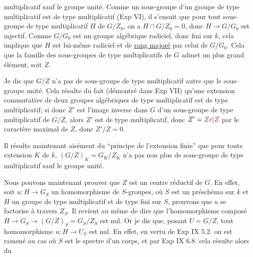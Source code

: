 multiplicatif  sauf le groupe unité. Comme un sous-groupe d'un groupe de type multiplicatif est de type multiplicatif (Exp VI\quad), il s'ensuit que  pour tout sous-groupe de type multiplicatif $H$ de $G/Z_0$, on a $H\cap G/Z_0=0$, donc $H\longrightarrow G/G_0$ est injectif. Comme $G/G_0$ est un groupe algébrique radiciel, donc fini sur $k$, cela implique que $H$ est lui-même radiciel et de \uline{rang majoré} par celui de $G/G_0$. Cela  que la famille des sous-groupes de type multiplicatifs de $G$ admet un plus grand élément, soit $Z$.

Je dis que $G/Z$ n'a pas de sous-groupe de type multiplicatif autre que le sous-groupe unité. Cela résulte du fait (démontré dans Exp VII\quad) qu'une extension commutative de deux groupes algébriques de type multiplicatif est de type multiplicatif;  si donc $Z'$ est l'image inverse dans $G$ d'un sous-groupe de type multiplicatif de $G/Z$, alors $Z'$ est de type multiplicatif, donc $Z'=\unsure{Zc|Z}$ par le caractère maximal de $Z$, donc $Z'/Z=0$.

Il résulte maintenant aisément du ``principe de l'extension finie'' que pour toute extension $K$ de $k$, $(G/Z)_K=G_K/Z_K$ n'a pas non plus de sous-groupe de type multiplicatif sauf le groupe unité.

Nous pouvons maintenant prouver que $Z$ est un centre réductif de $G$. En effet, soit $u:H\longrightarrow G_S$ un homomorphisme de $S$-groupes, où $S$ est un préschéma sur $k$ et $H$ un groupe de type multiplicatif et de type fini sur $S$, prouvons que $u$ se factorise à travers $Z_S$. Il revient au même de dire que l'homomorphisme composé $H\longrightarrow G_S\longrightarrow(G/Z)_S=G_S/Z_S$ est nul. Or je dis que, posant $U=G/Z$, tout homomorphisme $u:H\longrightarrow U_S$ est nul. En effet, en vertu de Exp IX 5.2. on est ramené au cas où $S$ est le spectre d'un corps, et par Exp IX 6.8. cela résulte alors du

